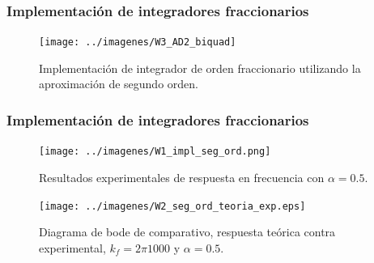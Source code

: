 \documentclass[10pt]{beamer}
\begin{document}
	\begin{frame}
		\frametitle{Implementación de integradores fraccionarios}
		\begin{figure}[!ht] 
		\caption{Implementación de integrador de orden fraccionario utilizando la aproximación de segundo orden.}
		\label{fig:W3_AD2_biquad}
		\centering
		\texttt{[image: ../imagenes/W3\_AD2\_biquad]}
	\end{figure}
	\end{frame}
	\begin{frame}
		\frametitle{Implementación de integradores fraccionarios}
		\begin{minipage}[t]{0.45\textwidth}
			\begin{figure}[!ht] 
		\caption{Resultados experimentales de respuesta en frecuencia con $\alpha = 0.5$.}
		\label{fig:W1_impl_seg_ord}
		\centering
		\texttt{[image: ../imagenes/W1\_impl\_seg\_ord.png]}
	\end{figure}
		\end{minipage} \hfill \begin{minipage}[t]{0.45\textwidth}
			\begin{figure}[!ht]
		\caption{Diagrama de bode de comparativo, respuesta teórica contra experimental,  $k_{f} = 2\pi 1000$ y  $\alpha = 0.5$.} 
		\label{fig:W2_seg_ord_teoria_exp}
		\centering
		\texttt{[image: ../imagenes/W2\_seg\_ord\_teoria\_exp.eps]}
	\end{figure}
		\end{minipage}
	\end{frame}
\end{document}

